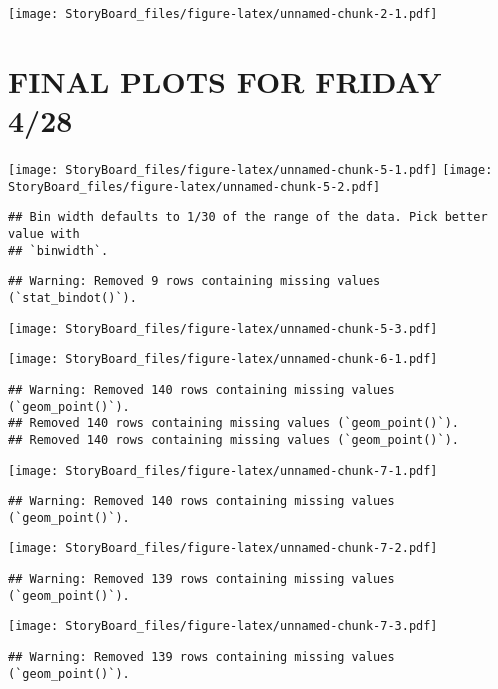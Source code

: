 \documentclass[
]{article}
\begin{document}
\texttt{[image: StoryBoard\_files/figure-latex/unnamed-chunk-2-1.pdf]}

\hypertarget{final-plots-for-friday-428}{%
\section{FINAL PLOTS FOR FRIDAY 4/28}\label{final-plots-for-friday-428}}

\texttt{[image: StoryBoard\_files/figure-latex/unnamed-chunk-5-1.pdf]}
\texttt{[image: StoryBoard\_files/figure-latex/unnamed-chunk-5-2.pdf]}

\begin{verbatim}
## Bin width defaults to 1/30 of the range of the data. Pick better value with
## `binwidth`.
\end{verbatim}

\begin{verbatim}
## Warning: Removed 9 rows containing missing values (`stat_bindot()`).
\end{verbatim}

\texttt{[image: StoryBoard\_files/figure-latex/unnamed-chunk-5-3.pdf]}

\texttt{[image: StoryBoard\_files/figure-latex/unnamed-chunk-6-1.pdf]}

\begin{verbatim}
## Warning: Removed 140 rows containing missing values (`geom_point()`).
## Removed 140 rows containing missing values (`geom_point()`).
## Removed 140 rows containing missing values (`geom_point()`).
\end{verbatim}

\texttt{[image: StoryBoard\_files/figure-latex/unnamed-chunk-7-1.pdf]}

\begin{verbatim}
## Warning: Removed 140 rows containing missing values (`geom_point()`).
\end{verbatim}

\texttt{[image: StoryBoard\_files/figure-latex/unnamed-chunk-7-2.pdf]}

\begin{verbatim}
## Warning: Removed 139 rows containing missing values (`geom_point()`).
\end{verbatim}

\texttt{[image: StoryBoard\_files/figure-latex/unnamed-chunk-7-3.pdf]}

\begin{verbatim}
## Warning: Removed 139 rows containing missing values (`geom_point()`).
\end{verbatim}
\end{document}
